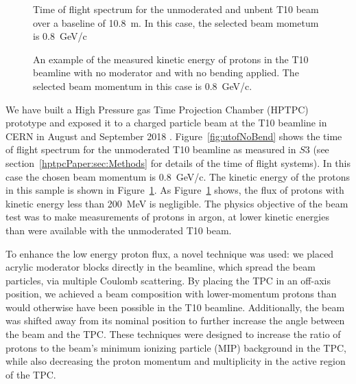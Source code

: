 \begin{figure}
  \begin{minipage}[t]{0.49\textwidth}
    \centering
    \begin{adjustbox}{max totalsize={\textwidth},center}
      
    \end{adjustbox}
    \caption{Time of flight spectrum for the unmoderated and unbent T10 beam over a baseline of 10.8~m. In this case, the selected beam mometum is 0.8~GeV/c}
    \label{fig:utofNoBend}
  \end{minipage}
  \hfill
  \begin{minipage}[t]{0.49\textwidth}
    \centering
    \begin{adjustbox}{max totalsize={\textwidth},center}
      
    \end{adjustbox}
    \caption{An example of the measured kinetic energy of protons in the T10 beamline with no moderator and with no bending applied. The selected beam momentum in this case is 0.8~GeV/c.}
    \label{fig:keNoBend}
  \end{minipage}
\end{figure}

We have built a High Pressure gas Time Projection Chamber (HPTPC) prototype and exposed it to a charged particle beam at the T10 beamline in CERN in August and September 2018 \cite{SPSC-P-355}.
Figure~\ref{fig:utofNoBend} shows the time of flight spectrum for the unmoderated T10 beamline as measured in $\mathit{S3}$ (see section~\ref{hptpcPaper:sec:Methods} for details of the time of flight systems).
In this case the chosen beam momentum is 0.8~GeV/c.
The kinetic energy of the protons in this sample is shown in Figure~\ref{fig:keNoBend}.
As Figure~\ref{fig:keNoBend} shows, the flux of protons with kinetic energy less than 200~MeV is negligible.
The physics objective of the beam test was to make measurements of protons in argon, at lower kinetic energies than were available with the unmoderated T10 beam. 

To enhance the low energy proton flux, a novel technique was used:
we placed acrylic moderator blocks directly in the beamline, which spread the beam particles, via multiple Coulomb scattering.
By placing the TPC in an off-axis position, we achieved a beam composition with lower-momentum protons than would otherwise have been possible in the T10 beamline.
Additionally, the beam was shifted away from its nominal position to further increase the angle between the beam and the TPC.
These techniques were designed to increase the ratio of protons to the beam's minimum ionizing particle (MIP) background in the TPC, while also decreasing the proton momentum and multiplicity in the active region of the TPC.

